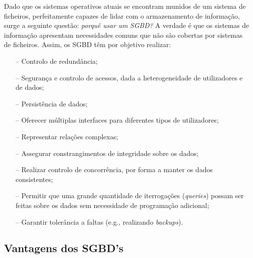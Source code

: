 \documentclass[titlepage]{book}
\theoremstyle{definition}
\begin{document}
Dado que os sistemas operativos atuais se encontram munidos de um sistema de ficheiros, perfeitamente capazes de lidar com o armazenamento de informação, surge a seguinte questão: \textit{porquê usar um SGBD?} A verdade é que os sistemas de informação apresentam necessidades comuns que não são cobertas por sistemas de ficheiros. Assim, os SGBD têm por objetivo realizar:

\begin{itemize}
    \itemsep0cm
    \item[--] Controlo de redundância;
    \item[--] Segurança e controlo de acessos, dada a heterogeneidade de utilizadores e de dados;
    \item[--] Persistência de dados;
    \item[--] Oferecer múltiplas interfaces para diferentes tipos de utilizadores;
    \item[--] Representar relações complexas;
    \item[--] Assegurar constrangimentos de integridade sobre os dados;
    \item[--] Realizar controlo de concorrência, por forma a manter os dados consistentes;
    \item[--] Permitir que uma grande quantidade de iterrogações (\textit{queries}) possam ser feitas sobre os dados sem necessidade de programação adicional;   
    \item[--] Garantir tolerância a faltas (e.g., realizando \textit{backups}). 
\end{itemize}

\subsection{Vantagens dos SGBD's}
\vspace{0.25cm}
\end{document}
